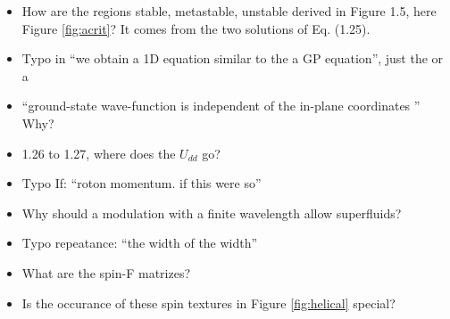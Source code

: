 \begin{itemize}
        \item How are the regions stable, metastable, unstable derived in Figure 1.5, here Figure \ref{fig:acrit}? 
        {\color{red}  It comes from the two solutions of Eq. (1.25).}

\end{itemize}

\begin{itemize}
        \item Typo in ``we obtain a 1D equation similar to the a GP equation'', just the or a
        \item ``ground-state wave-function is independent of the in-plane coordinates '' Why?
        \item 1.26 to 1.27, where does the $U_{dd}$ go?
        \item Typo If: ``roton momentum. if this were so''
        \item Why should a modulation with a finite wavelength allow superfluids?
        \item Typo repeatance: ``the width of the width''
        \item What are the spin-F matrizes?
        \item Is the occurance of these spin textures in Figure \ref{fig:helical} special?
\end{itemize}


